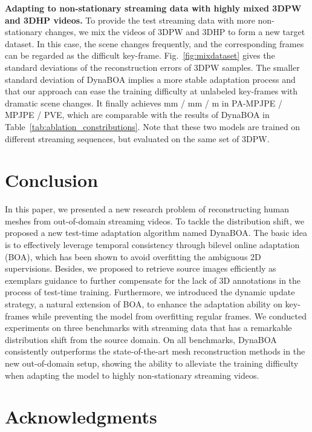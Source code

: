 \documentclass[10pt,journal,compsoc]{IEEEtran}
\newcommand{\tab}[1]{Table~\ref{#1}}
\newcommand{\fig}[1]{Fig.~\ref{#1}}
\newcommand{\myparagraph}[1]{\vspace{5pt} \noindent \textbf{#1}}
\begin{document}
\myparagraph{Adapting to non-stationary streaming data with highly mixed 3DPW and 3DHP videos.} 
To provide the test streaming data with more non-stationary changes, we mix the videos of 3DPW and 3DHP to form a new target dataset. In this case, the scene changes frequently, and the corresponding frames can be regarded as the difficult key-frame.
\fig{fig:mixdataset} gives the standard deviations of the reconstruction errors of 3DPW samples. The smaller standard deviation of DynaBOA implies a more stable adaptation process and that our approach can ease the training difficulty at unlabeled key-frames with dramatic scene changes. It finally achieves mm / mm / m in PA-MPJPE / MPJPE / PVE, which are comparable with the results of DynaBOA in \tab{tab:ablation_constributions}.
Note that these two models are trained on different streaming sequences, but evaluated on the same set of 3DPW.

 \section{Conclusion}
In this paper, we presented a new research problem of reconstructing human meshes from out-of-domain streaming videos. 
To tackle the distribution shift, we proposed a new test-time adaptation algorithm named DynaBOA. 
The basic idea is to effectively leverage temporal consistency through bilevel online adaptation (BOA), which has been shown to avoid overfitting the ambiguous 2D supervisions.
Besides, we proposed to retrieve source images efficiently as exemplars guidance to further compensate for the lack of 3D annotations in the process of test-time training. 
Furthermore, we introduced the dynamic update strategy, a natural extension of BOA, to enhance the adaptation ability on key-frames while preventing the model from overfitting regular frames.
We conducted experiments on three benchmarks with streaming data that has a remarkable distribution shift from the source domain. 
On all benchmarks, DynaBOA consistently outperforms the state-of-the-art mesh reconstruction methods in the new out-of-domain setup, showing the ability to alleviate the training difficulty when adapting the model to highly non-stationary streaming videos. 












\ifCLASSOPTIONcompsoc
\section*{Acknowledgments}
\else
\end{document}

